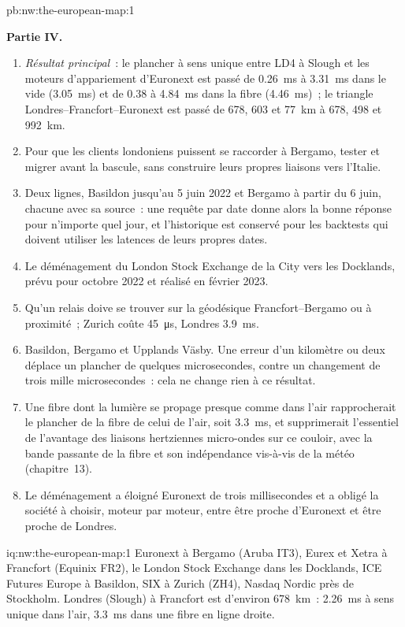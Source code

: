 \begin{solution}{pb:nw:the-european-map:1}
\begin{enumerate}[resume]
\end{enumerate}
\textbf{Partie IV.}
\begin{enumerate}[resume]
\item \emph{Résultat principal}~: le plancher à sens unique entre LD4 à Slough et les moteurs d'appariement d'Euronext est passé de \qty{0.26}{\milli\second} à
  \qty{3.31}{\milli\second} dans le vide (\qty{+3.05}{\milli\second}) et de 0.38 à \qty{4.84}{\milli\second} dans la fibre
  (\qty{+4.46}{\milli\second})~; le triangle Londres--Francfort--Euronext est passé de 678, 603 et \qty{77}{\kilo\metre} à 678, 498 et
  \qty{992}{\kilo\metre}.
\item Pour que les clients londoniens puissent se raccorder à Bergamo, tester et migrer avant la bascule, sans construire leurs propres liaisons vers l'Italie.
\item Deux lignes, Basildon jusqu'au 5 juin 2022 et Bergamo à partir du 6 juin, chacune avec sa source~: une requête par date donne alors la bonne réponse pour n'importe quel
  jour, et l'historique est conservé pour les backtests qui doivent utiliser les latences de leurs propres dates.
\item Le déménagement du London Stock Exchange de la City vers les Docklands, prévu pour octobre 2022 et réalisé en février 2023.
\item Qu'un relais doive se trouver sur la géodésique Francfort--Bergamo ou à proximité~; Zurich coûte \qty{45}{\micro\second}, Londres \qty{3.9}{\milli\second}.
\item Basildon, Bergamo et Upplands Väsby. Une erreur d'un kilomètre ou deux déplace un plancher de quelques microsecondes, contre un changement de trois
  mille microsecondes~: cela ne change rien à ce résultat.
\item Une fibre dont la lumière se propage presque comme dans l'air rapprocherait le plancher de la fibre de celui de l'air, soit \qty{3.3}{\milli\second}, et supprimerait l'essentiel
  de l'avantage des liaisons hertziennes micro-ondes sur ce couloir, avec la bande passante de la fibre et son indépendance vis-à-vis de la météo (chapitre~13).
\item Le déménagement a éloigné Euronext de trois millisecondes et a obligé la société à choisir, moteur par moteur, entre être proche d'Euronext et être proche de Londres.
\end{enumerate}
\end{solution}

\begin{solution}{iq:nw:the-european-map:1}
Euronext à Bergamo (Aruba IT3), Eurex et Xetra à Francfort (Equinix FR2), le London Stock Exchange dans les Docklands, ICE Futures Europe à
Basildon, SIX à Zurich (ZH4), Nasdaq Nordic près de Stockholm. Londres (Slough) à Francfort est d'environ \qty{678}{\kilo\metre}~: \qty{2.26}{\milli\second}
à sens unique dans l'air, \qty{3.3}{\milli\second} dans une fibre en ligne droite.
\end{solution}

